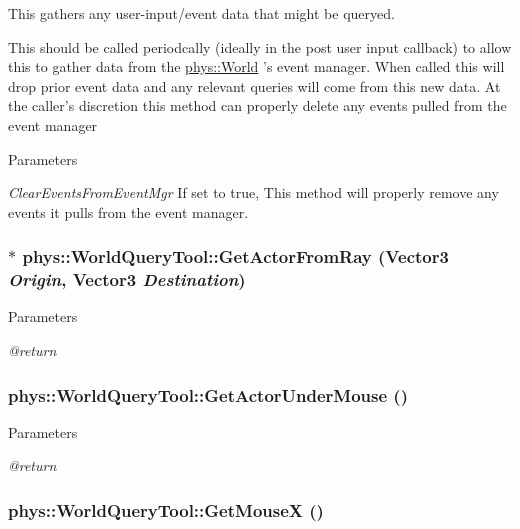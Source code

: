 This gathers any user-\/input/event data that might be queryed. 

This should be called periodcally (ideally in the post user input callback) to allow this to gather data from the \hyperlink{classphys_1_1World}{phys::World} 's event manager. When called this will drop prior event data and any relevant queries will come from this new data. At the caller's discretion this method can properly delete any events pulled from the event manager 
\begin{DoxyParams}{Parameters}
\item[{\em ClearEventsFromEventMgr}]If set to true, This method will properly remove any events it pulls from the event manager. \end{DoxyParams}
\hypertarget{classphys_1_1WorldQueryTool_a70cb78186d7c4fafcbf17b8ccde4bab2}{
\subsubsection[{GetActorFromRay}]{$\ast$ phys::WorldQueryTool::GetActorFromRay ({\bf Vector3} {\em Origin}, \/  {\bf Vector3} {\em Destination})}}
\label{d8/d69/classphys_1_1WorldQueryTool_a70cb78186d7c4fafcbf17b8ccde4bab2}

\begin{DoxyParams}{Parameters}
\item[{\em @return}]\end{DoxyParams}
\hypertarget{classphys_1_1WorldQueryTool_a85c3bcafc9ceea4ed485ff457d7b1f7b}{
\subsubsection[{GetActorUnderMouse}]{ phys::WorldQueryTool::GetActorUnderMouse ()}}
\label{d8/d69/classphys_1_1WorldQueryTool_a85c3bcafc9ceea4ed485ff457d7b1f7b}

\begin{DoxyParams}{Parameters}
\item[{\em @return}]\end{DoxyParams}
\hypertarget{classphys_1_1WorldQueryTool_a55721f152fb117fdfb8bc6d20af6b1dc}{
\subsubsection[{GetMouseX}]{ phys::WorldQueryTool::GetMouseX ()}}
\label{d8/d69/classphys_1_1WorldQueryTool_a55721f152fb117fdfb8bc6d20af6b1dc}


